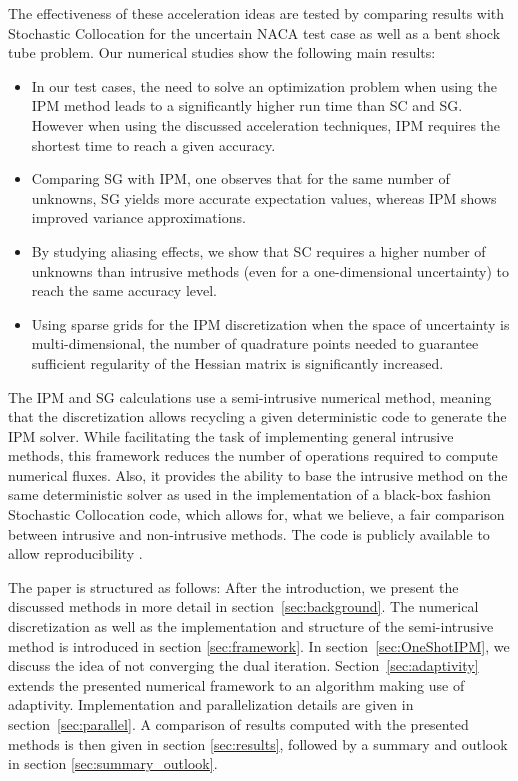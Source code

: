The effectiveness of these acceleration ideas are tested by comparing results with Stochastic Collocation for the uncertain NACA test case as well as a bent shock tube problem. Our numerical studies show the following main results:
\begin{itemize}
\item In our test cases, the need to solve an optimization problem when using the IPM method leads to a significantly higher run time than SC and SG. However when using the discussed acceleration techniques, IPM requires the shortest time to reach a given accuracy.
\item Comparing SG with IPM, one observes that for the same number of unknowns, SG yields more accurate expectation values, whereas IPM shows improved variance approximations.
\item By studying aliasing effects, we show that SC requires a higher number of unknowns than intrusive methods (even for a one-dimensional uncertainty) to reach the same accuracy level.
\item Using sparse grids for the IPM discretization when the space of uncertainty is multi-dimensional, the number of quadrature points needed to guarantee sufficient regularity of the Hessian matrix is significantly increased.
\end{itemize}
The IPM and SG calculations use a semi-intrusive numerical method, meaning that the discretization allows recycling a given deterministic code to generate the IPM solver. While facilitating the task of implementing general intrusive methods, this framework reduces the number of operations required to compute numerical fluxes. Also, it provides the ability to base the intrusive method on the same deterministic solver as used in the implementation of a black-box fashion Stochastic Collocation code, which allows for, what we believe, a fair comparison between intrusive and non-intrusive methods. The code is publicly available to allow reproducibility \cite{uqcreator}.

The paper is structured as follows: After the introduction, we present the discussed methods in more detail in section~\ref{sec:background}. The numerical discretization as well as the implementation and structure of the semi-intrusive method is introduced in section \ref{sec:framework}. In section~\ref{sec:OneShotIPM}, we discuss the idea of not converging the dual iteration. Section~\ref{sec:adaptivity} extends the presented numerical framework to an algorithm making use of adaptivity. Implementation and parallelization details are given in section~\ref{sec:parallel}. A comparison of results computed with the presented methods is then given in section \ref{sec:results}, followed by a summary and outlook in section \ref{sec:summary_outlook}.

